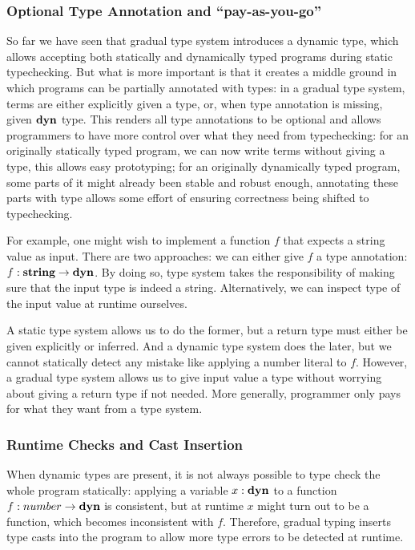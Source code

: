 \subsubsection{Optional Type Annotation and ``pay-as-you-go''}

So far we have seen that gradual type system introduces a dynamic type,
which allows accepting both statically and dynamically typed programs during static typechecking.
But what is more important is that it creates a middle ground in which programs
can be partially annotated with types:
in a gradual type system, terms are either explicitly given a type,
or, when type annotation is missing, given $\textbf{dyn}$ type.
This renders all type annotations to be optional and allows programmers
to have more control over what they need from typechecking:
for an originally statically typed program, we can now write terms without giving a type,
this allows easy prototyping; for an originally dynamically typed program,
some parts of it might already been stable and robust enough, annotating these parts
with type allows some effort of ensuring correctness being shifted to typechecking.

For example, one might wish to implement a function $f$ that expects a string value
as input. There are two approaches: we can either give $f$ a type annotation:
$f : \textbf{string} \rightarrow \textbf{dyn}$. By doing so, type system takes the responsibility
of making sure that the input type is indeed a string. Alternatively,
we can inspect type of the input value at runtime ourselves.

A static type system allows us to do the former, but a return type must either
be given explicitly or inferred. And a dynamic type system does the later, but
we cannot statically detect any mistake like applying a number literal to $f$.
However, a gradual type system allows us to give input value a type
without worrying about giving a return type if not needed.
More generally, programmer only pays for what they want from a type system.


\subsubsection{Runtime Checks and Cast Insertion}


When dynamic types are present, it is not always possible to type check the whole
program statically: applying a variable $x : \textbf{dyn}$ to a function $f : number \rightarrow \textbf{dyn}$ is consistent, but at runtime $x$ might turn out to be a function, which becomes inconsistent
with $f$. Therefore, gradual typing inserts type casts into the program to allow
more type errors to be detected at runtime.

